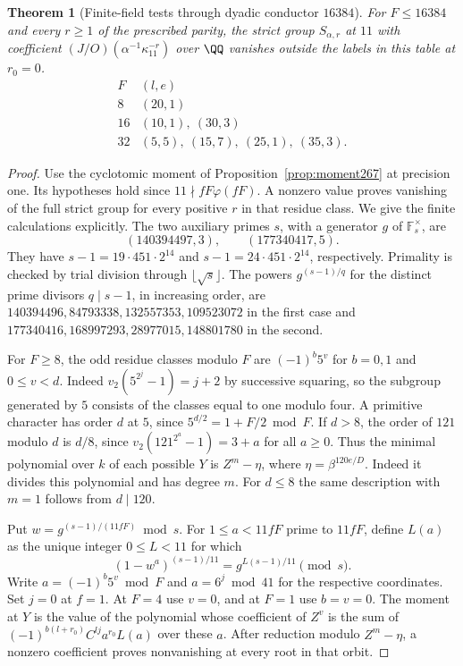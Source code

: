 \documentclass[a4paper,11pt]{article}
\newtheorem{theorem}[proposition]{Theorem}
\theoremstyle{definition}
\theoremstyle{remark}
\numberwithin{equation}{section}
\begin{document}
\begin{theorem}[Finite-field tests through dyadic conductor \(16384\)]\leavevmode
\label{thm:towerres317}
For \(F\le 16384\) and every \(r\ge1\) of the prescribed parity,
the strict group \(S_{\alpha,r}\) at \(11\) with coefficient
\((J/O)(\alpha^{-1}\kappa_{11}^{-r})\) over \(\QQ\) vanishes
outside the labels in this table at \(r_0=0\).
\[
 \begin{array}{c|l}
 F &(l,e)\\ \hline
 8 &(20,1)\\
 16 &(10,1),\ (30,3)\\
 32 &(5,5),\ (15,7),\ (25,1),\ (35,3).
 \end{array}
\]
\end{theorem}
\begin{proof}
Use the cyclotomic moment of Proposition~\ref{prop:moment267}
at precision one. Its hypotheses hold since
\(11\nmid fF\varphi(fF)\). A nonzero value proves vanishing
of the full strict group for every positive \(r\) in that
residue class. We give the finite calculations explicitly.
The two auxiliary primes \(s\), with a generator \(g\) of
\(\mathbb F_s^\times\), are
\[
          (140394497,3),\qquad(177340417,5).
\]
They have \(s-1=19\cdot451\cdot 2^{14}\) and
\(s-1=24\cdot451\cdot 2^{14}\), respectively.
Primality is checked by trial division through
\(\lfloor\sqrt s\rfloor\). The powers \(g^{(s-1)/q}\) for
the distinct prime divisors \(q\mid s-1\), in increasing
order, are \(140394496,84793338,132557353,109523072\) in
the first case and \(177340416,168997293,28977015,148801780\)
in the second.

For \(F\ge8\), the odd residue classes modulo \(F\) are
\((-1)^b5^v\) for \(b=0,1\) and \(0\le v<d\).
Indeed \(v_2(5^{2^j}-1)=j+2\) by successive squaring, so
the subgroup generated by \(5\) consists of the classes equal
to one modulo four. A primitive character has order \(d\)
at \(5\), since \(5^{d/2}=1+F/2\bmod F\). If \(d>8\),
the order of \(121\) modulo \(d\) is \(d/8\), since
\(v_2(121^{2^a}-1)=3+a\) for all \(a\ge0\). Thus the
minimal polynomial over \(k\) of each possible \(Y\) is
\(Z^m-\eta\), where \(\eta=\beta^{120e/D}\).
Indeed it divides this polynomial and has degree \(m\).
For \(d\le8\) the same description with \(m=1\) follows
from \(d\mid120\).

Put \(w=g^{(s-1)/(11fF)}\bmod s\). For
\(1\le a<11fF\) prime to \(11fF\), define \(L(a)\) as the
unique integer \(0\le L<11\) for which
\[
       (1-w^a)^{(s-1)/11}=g^{L(s-1)/11}\pmod{s}.
\]
Write \(a=(-1)^b5^v\bmod F\) and \(a=6^j\bmod41\) for the
respective coordinates. Set \(j=0\) at \(f=1\). At \(F=4\)
use \(v=0\), and at \(F=1\) use \(b=v=0\).
The moment at \(Y\) is the value of the polynomial whose
coefficient of \(Z^v\) is the sum of
\((-1)^{b(l+r_0)} C^{lj}a^{r_0}L(a)\) over these \(a\).
After reduction modulo \(Z^m-\eta\), a nonzero coefficient
proves nonvanishing at every root in that orbit.


\end{proof}
\end{document}
